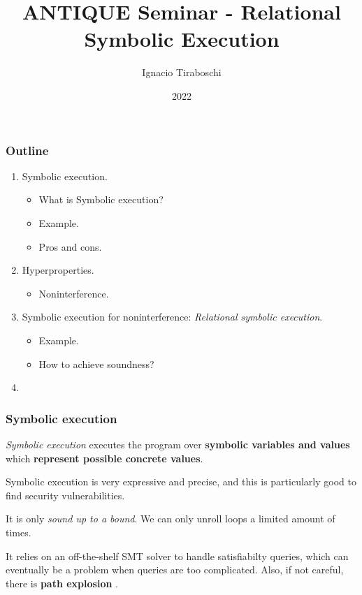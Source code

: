 \documentclass{beamer}
\title[ANTIQUE Seminar]{ANTIQUE Seminar - Relational Symbolic Execution}
\author{Ignacio Tiraboschi}
\institute[INRIA / ENS]{INRIA Paris - ENS Paris}
\date{2022}
\begin{document}
\frame{\titlepage}

\begin{frame}
  \frametitle{Outline}
  \begin{enumerate}
    \item Symbolic execution.
    \begin{itemize}
      \item What is Symbolic execution?
      \item Example.
      \item Pros and cons.
    \end{itemize}
    \item Hyperproperties.
    \begin{itemize}
      \item Noninterference.
    \end{itemize}
    \item Symbolic execution for noninterference: \emph{Relational symbolic execution}.
    \begin{itemize}
      \item Example.
      \item How to achieve soundness?
    \end{itemize}
    \item 
  \end{enumerate}
\end{frame}

\begin{frame}
  \frametitle{Symbolic execution}
  \emph{Symbolic execution} executes the program over \textbf{symbolic variables and values} which
  \textbf{represent possible concrete values}.
  
  \pause
  \vspace{1em}
  Symbolic execution is very expressive and precise, and this is particularly good to find
  security vulnerabilities.
  
  \pause
  \vspace{1em}
  It is only \emph{sound up to a bound}. We can only unroll loops a limited amount of times.

  \pause
  \vspace{1em}
  It relies on an off-the-shelf SMT solver to handle satisfiabilty queries, which can eventually
  be a problem when queries are too complicated. Also, if not careful, there is
  \textbf{path explosion} \citep{DBLP:journals/cacm/CadarS13}.
\end{frame}
\end{document}
